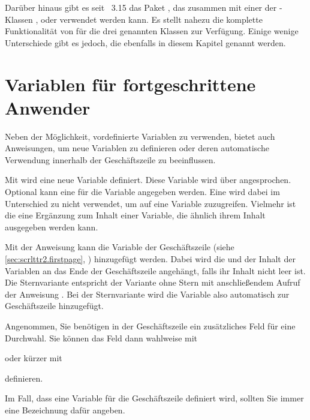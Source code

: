 %
Darüber hinaus gibt es seit
\KOMAScript~3.15 das Paket
, das zusammen mit einer der
\KOMAScript-Klassen ,  oder 
verwendet werden kann. Es stellt nahezu die komplette Funktionalität von
 für die drei genannten Klassen zur Verfügung. Einige wenige
Unterschiede gibt es jedoch, die ebenfalls in diesem Kapitel genannt werden.%


\section{Variablen für fortgeschrittene Anwender}
\BeginIndexGroup
{}

Neben der Möglichkeit, vordefinierte Variablen zu verwenden, bietet
\KOMAScript{} auch Anweisungen, um neue Variablen zu definieren oder deren
automatische Verwendung innerhalb der Geschäftszeile zu beeinflussen.


\begin{Declaration}
\end{Declaration}
Mit  wird eine neue Variable definiert. Diese Variable wird
über  angesprochen. Optional kann eine  für die
Variable  angegeben werden. Eine  wird dabei im
Unterschied zu  nicht verwendet, um auf eine Variable
zuzugreifen. Vielmehr ist die  eine Ergänzung zum Inhalt
einer Variable, die ähnlich ihrem Inhalt ausgegeben werden kann.

Mit der Anweisung  kann die Variable  der
Geschäftszeile
(siehe \autoref{sec:scrlttr2.firstpage},
) hinzugefügt werden. Dabei wird die
 und der Inhalt der Variablen an das Ende der
Geschäftszeile angehängt, falls ihr Inhalt nicht leer ist. Die Sternvariante
 entspricht der Variante ohne Stern mit anschließendem
Aufruf der Anweisung . Bei der Sternvariante wird die
Variable also automatisch zur Geschäftszeile hinzugefügt.
\begin{Example}
  Angenommen, Sie benötigen in der Geschäftszeile ein zusätzliches Feld
  für eine Durchwahl. Sie können das Feld dann wahlweise mit
\begin{lstcode}
\end{lstcode}
  oder kürzer mit
\begin{lstcode}
\end{lstcode}
  definieren.
\end{Example}
Im Fall, dass eine Variable für die Geschäftszeile
definiert wird, sollten Sie immer eine Bezeichnung dafür angeben.

